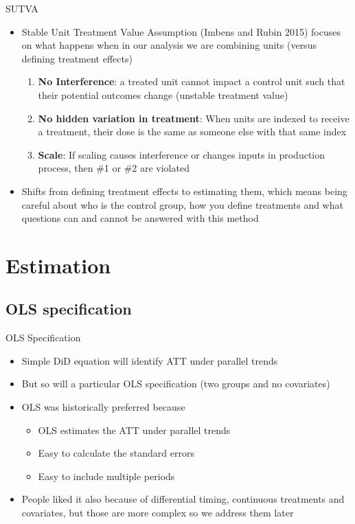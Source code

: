 \documentclass{beamer}
\begin{document}
\begin{frame}{SUTVA}

\begin{itemize}
\item Stable Unit Treatment Value Assumption (Imbens and Rubin 2015) focuses on what happens when in our analysis we are combining units (versus defining treatment effects)
	\begin{enumerate}
	\item \textbf{No Interference}: a treated unit cannot impact a control unit such that their potential outcomes change (unstable treatment value)
	\item \textbf{No hidden variation in treatment}: When units are indexed to receive a treatment, their dose is the same as someone else with that same index
	\item \textbf{Scale}: If scaling causes interference or changes inputs in production process, then \#1 or \#2 are violated
	\end{enumerate}
\item Shifts from defining treatment effects to estimating them, which means being careful about who is the control group, how you define treatments and what questions can and cannot be answered with this method
\end{itemize}

\end{frame}




\section{Estimation}

\subsection{OLS specification}

\begin{frame}{OLS Specification}
	
	\begin{itemize}
	\item Simple DiD equation will identify ATT under parallel trends
	\item But so will a particular OLS specification (two groups and no covariates)
	\item OLS was historically preferred because
		\begin{itemize}
		\item OLS estimates the ATT under parallel trends
		\item Easy to calculate the standard errors
		\item Easy to include multiple periods
		\end{itemize}
	\item People liked it also because of differential timing, continuous treatments and covariates, but those are more complex so we address them later
	\end{itemize}
\end{frame}
\end{document}
